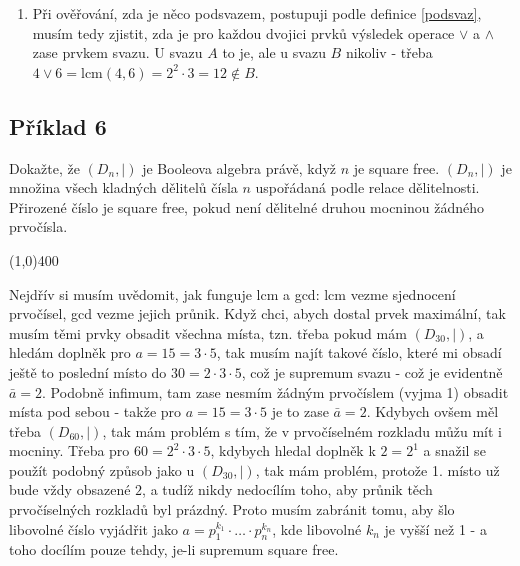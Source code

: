 \documentclass{article}
\begin{document}
\begin{enumerate}
\begin{proof}
Jelikož operace $\cup$ a $\cap$ jsou distributivní, pak i gcd a lcm jsou distributivní. 
\end{proof}

Svaz není komplementární, protože třeba k prvku 2 nejsem schopen najít doplněk. Není to tedy ani Booleova algebra.

\item Při ověřování, zda je něco podsvazem, postupuji podle definice \ref{podsvaz}, musím tedy zjistit, zda je pro každou dvojici prvků výsledek operace $\vee$ a $\wedge$ zase prvkem svazu. U svazu $A$ to je, ale u svazu $B$ nikoliv - třeba $4 \vee 6 = \mbox{lcm}(4,6) = 2^2\cdot3=12 \notin B$.

\end{enumerate}

\subsection{Příklad 6}
Dokažte, že $(D_{n},|)$ je Booleova algebra právě, když $n$ je square free. $(D_{n},|)$ je množina všech kladných dělitelů čísla $n$ uspořádaná podle relace dělitelnosti. Přirozené číslo je square free, pokud není dělitelné druhou mocninou žádného prvočísla.

\line(1,0){400}

Nejdřív si musím uvědomit, jak funguje lcm a gcd: lcm vezme sjednocení prvočísel, gcd vezme jejich průnik. Když chci, abych dostal prvek maximální, tak musím těmi prvky obsadit všechna místa, tzn. třeba pokud mám $(D_{30},|)$, a hledám doplněk pro $a = 15 = 3\cdot5$, tak musím najít takové číslo, které mi obsadí ještě to poslední místo do $30 = 2\cdot3\cdot 5$, což je supremum svazu - což je evidentně $\bar{a} = 2$. Podobně infimum, tam zase nesmím žádným prvočíslem (vyjma 1) obsadit místa pod sebou - takže pro $a = 15 = 3\cdot5$ je to zase $\bar{a} = 2$. Kdybych ovšem měl třeba $(D_{60},|)$, tak mám problém s tím, že v prvočíselném rozkladu můžu mít i mocniny. Třeba pro $60 = 2^2\cdot3\cdot5$, kdybych hledal doplněk k $2=2^1$ a snažil se použít podobný způsob jako u $(D_{30},|)$, tak mám problém, protože 1. místo už bude vždy obsazené $2$, a tudíž nikdy nedocílím toho, aby průnik těch prvočíselných rozkladů byl prázdný. Proto musím zabránit tomu, aby šlo libovolné číslo vyjádřit jako $a = p_1^{k_1}\cdot \ldots \cdot p_n^{k_n}$, kde libovolné $k_n$ je vyšší než 1 - a toho docílím pouze tehdy, je-li supremum square free. 
\end{document}
